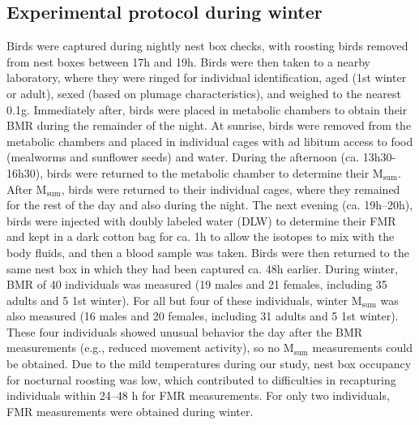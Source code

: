 \documentclass[10pt, twoside]{book} %
\begin{document}
\subsection{Experimental protocol during winter}
Birds were captured during nightly nest box checks, with roosting birds removed from nest boxes between 17h and 19h. Birds were then taken to a nearby laboratory, where they were ringed for individual identification, aged (1st winter or adult), sexed (based on plumage characteristics), and weighed to the nearest 0.1g. Immediately after, birds were placed in metabolic chambers to obtain their BMR during the remainder of the night. At sunrise, birds were removed from the metabolic chambers and placed in individual cages with ad libitum access to food (mealworms and sunflower seeds) and water. During the afternoon (ca. 13h30-16h30), birds were returned to the metabolic chamber to determine their M$_{\text{sum}}$. After M$_{\text{sum}}$, birds were returned to their individual cages, where they remained for the rest of the day and also during the night. The next evening (ca. 19h–20h), birds were injected with doubly labeled water (DLW) to determine their FMR and kept in a dark cotton bag for ca. 1h to allow the isotopes to mix with the body fluids, and then a blood sample was taken. Birds were then returned to the same nest box in which they had been captured ca. 48h earlier. During winter, BMR of 40 individuals was measured (19 males and 21 females, including 35 adults and 5 1st winter). For all but four of these individuals, winter M$_{\text{sum}}$ was also measured (16 males and 20 females, including 31 adults and 5 1st winter). These four individuals showed unusual behavior the day after the BMR measurements (e.g., reduced movement activity), so no M$_{\text{sum}}$ measurements could be obtained. Due to the mild temperatures during our study, nest box occupancy for nocturnal roosting was low, which contributed to difficulties in recapturing individuals within 24–48 h for FMR measurements. For only two individuals, FMR measurements were obtained during winter.
\end{document}
